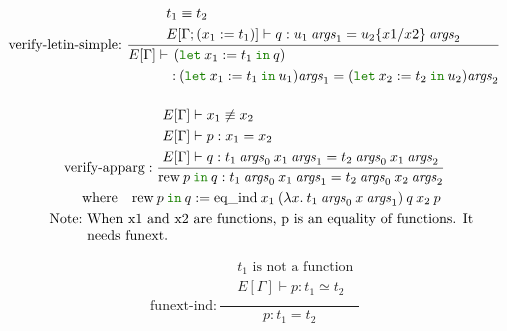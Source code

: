 \documentclass[a4paper,fleqn]{article}
\newcommand{\kwlet}{\mbox{\color{mygreen}\ttfamily let}}
\newcommand{\kwin}{\mbox{\color{mygreen}\ttfamily in}}
\newcommand{\lam}[2]{\lambda #1.\:#2}
\newcommand{\ldefB}[2]{(#1:=#2)}
\newcommand{\breakrule}{\\[0.5em]}
\newcommand{\subst}[3]{#1\{#2/#3\}}
\begin{document}
\begin{gather*}
  \text{verify-letin-simple:}~
    \dfrac{
      \begin{aligned}
        & t_1 \equiv t_2 \\
        & E[\Gamma; \ldefB{x_1}{t_1}] \vdash q : u_1\:\mathit{args}_1 = \subst{u_2}{x1}{x2}\:\mathit{args}_2
      \end{aligned}
    }{
      E[\Gamma] \vdash
        \begin{aligned}[t]
          ( & \kwlet\: x_1 := t_1 \:\kwin\: q) \\
          :\: & (\kwlet\: x_1 := t_1 \:\kwin\: u_1)\mathit{args}_1 = (\kwlet\: x_2 := t_2 \:\kwin\: u_2)\mathit{args}_2
        \end{aligned}
    } \breakrule
\end{gather*}

\begin{gather*}
  \text{verify-apparg}:
    \dfrac{
      \begin{aligned}
        & E[\Gamma] \vdash x_1 \not\equiv x_2 \\
        & E[\Gamma] \vdash p : x_1 = x_2 \\
        & E[\Gamma] \vdash q : t_1\: \mathit{args}_0\: x_1\: \mathit{args}_1 = t_2\: \mathit{args}_0\: x_1\: \mathit{args}_2
      \end{aligned}
    }{
      \mbox{rew}\: p\: \kwin\: q : t_1\: \mathit{args}_0\: x_1\: \mathit{args}_1 = t_2\: \mathit{args}_0\: x_2\: \mathit{args}_2
    } \\
    \quad \mbox{where} \quad \mbox{rew}\: p\: \kwin\: q := \mbox{eq\_ind}\: x_1\: (\lam{x}{t_1\: \mathit{args}_0\: x\: \mathit{args}_1})\: q\: x_2\: p \\
    \quad \mbox{Note:}~
      \begin{minipage}[t]{0.8\columnwidth}
        When x1 and x2 are functions, p is an equality of functions.  It needs funext.
      \end{minipage}
\end{gather*}

\begin{gather*}
  \text{funext-ind}:
    \dfrac{
      \begin{aligned}
        & \mbox{$t_1$ is not a function} \\
        & E[\Gamma] \vdash p : t_1 \simeq t_2 \\
      \end{aligned}
    }{
      p : t_1 = t_2
    }
\end{gather*}
\end{document}
